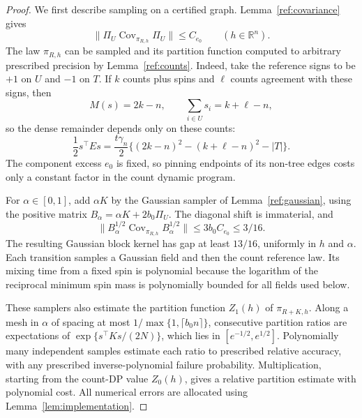 \documentclass[11pt]{article}
\def\R{\mathbb{R}}
\numberwithin{equation}{section}
\begin{document}
\begin{proof}
We first describe sampling on a certified graph. Lemma~\ref{ref:covariance} gives
\[
 \|\Pi_U\operatorname{Cov}_{\pi_{R,h}}\Pi_U\|\le C_{e_0}
 \qquad(h\in\R^n).
\]
The law $\pi_{R,h}$ can be sampled and its partition function computed to arbitrary prescribed precision by Lemma~\ref{ref:counts}. Indeed, take the reference signs to be $+1$ on $U$ and $-1$ on $T$. If $k$ counts plus spins and $\ell$ counts agreement with these signs, then
\[
 M(s)=2k-n,\qquad \sum_{i\in U}s_i=k+\ell-n,
\]
so the dense remainder depends only on these counts:
\[
 \frac12s^\top Es=\frac{t\gamma_n}{2}
 \big\{(2k-n)^2-(k+\ell-n)^2-|T|\big\}.
\]
The component excess $e_0$ is fixed, so pinning endpoints of its non-tree edges costs only a constant factor in the count dynamic program.

For $\alpha\in[0,1]$, add $\alpha K$ by the Gaussian sampler of Lemma~\ref{ref:gaussian}, using the positive matrix $B_\alpha=\alpha K+2b_0\Pi_U$. The diagonal shift is immaterial, and
\[
 \|B_\alpha^{1/2}\operatorname{Cov}_{\pi_{R,h}}B_\alpha^{1/2}\|
 \le3b_0C_{e_0}\le3/16.
\]
The resulting Gaussian block kernel has gap at least $13/16$, uniformly in $h$ and $\alpha$. Each transition samples a Gaussian field and then the count reference law. Its mixing time from a fixed spin is polynomial because the logarithm of the reciprocal minimum spin mass is polynomially bounded for all fields used below.

These samplers also estimate the partition function $Z_1(h)$ of $\pi_{R+K,h}$. Along a mesh in $\alpha$ of spacing at most $1/\max\{1,\lceil b_0n\rceil\}$, consecutive partition ratios are expectations of $\exp\{s^\top Ks/(2N)\}$, which lies in $[e^{-1/2},e^{1/2}]$. Polynomially many independent samples estimate each ratio to prescribed relative accuracy, with any prescribed inverse-polynomial failure probability. Multiplication, starting from the count-DP value $Z_0(h)$, gives a relative partition estimate with polynomial cost. All numerical errors are allocated using Lemma~\ref{lem:implementation}.


\end{proof}
\end{document}
